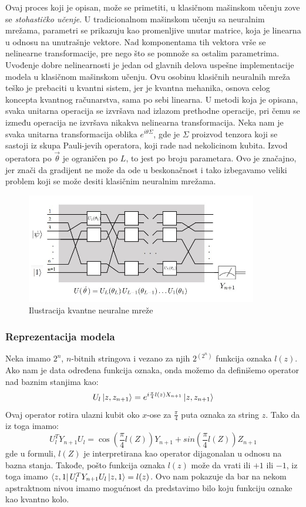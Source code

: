 \documentclass[12pt, letterpaper, oneside]{article}
\begin{document}
Ovaj proces koji je opisan, može se primetiti, u klasičnom mašinskom učenju zove se \textit{stohastičko učenje}.
U tradicionalnom mašinskom učenju sa neuralnim mrežama, parametri se prikazuju kao promenljive unutar matrice, koja je linearna u odnosu na unutrašnje vektore.
Nad komponentama tih vektora vrše se nelinearne transformacije, pre nego što se pomnože sa ostalim parametrima. 
Uvođenje dobre nelinearnosti je jedan od glavnih delova uspešne implementacije modela u klasičnom mašinskom učenju.
Ovu osobinu klasičnih neuralnih mreža teško je prebaciti u kvantni sistem, jer je kvantna mehanika, osnova celog koncepta kvantnog računarstva, sama po sebi linearna.
U metodi koja je opisana, svaka unitarna operacija se izvršava nad izlazom prethodne operacije, pri čemu se između operacija ne izvršava nikakva nelinearna transformacija.
Neka nam je svaka unitarna transformacija oblika $e^{i\theta\Sigma}$, gde je $\Sigma$ proizvod tenzora koji se sastoji iz skupa Pauli-jevih operatora, koji rade nad nekolicinom kubita.
Izvod operatora po $\overrightarrow{\theta}$ je ograničen po $L$, to jest po broju parametara. Ovo je značajno, jer znači da gradijent ne može da ode u beskonačnost i tako izbegavamo 
veliki problem koji se može desiti klasičnim neuralnim mrežama.

\begin{figure}[ht]
    \centering
    \includegraphics[width=0.9\textwidth]{files/QNN.jpg}
    \caption{Ilustracija kvantne neuralne mreže \cite{Classification_wit_QNN}}
\end{figure}

\subsubsection{Reprezentacija modela}
Neka imamo $2^n$, $n$-bitnih stringova i vezano za njih $2^{(2^n)}$ funkcija oznaka $l(z)$.
Ako nam je data određena funkcija oznaka, onda možemo da definišemo operator nad baznim stanjima kao:
\[
    U_l\Ket{z,z_{n+1}} = e^{i\frac{\pi}{4}l(z)X_{n+1}}\Ket{z,z_{n+1}}
\]
Ovaj operator rotira ulazni kubit oko $x$-ose za $\frac{\pi}{4}$ puta oznaka za string $z$.
Tako da iz toga imamo:
\[
    U_l^TY_{n+1}U_l = \cos(\frac{\pi}{4}l(Z))Y_{n+1} + sin(\frac{\pi}{4}l(Z))Z_{n+1}
\]
gde u formuli, $l(Z)$ je interpretirana kao operator dijagonalan u odnosu na bazna stanja.
Takođe, pošto funkcija oznaka $l(z)$ može da vrati ili $+1$ ili $-1$, iz toga imamo $\bra{z,1}U_l^TY_{n+1}U_l\ket{z,1} = l(z)$.
Ovo nam pokazuje da bar na nekom apstraktnom nivou imamo mogućnost da predstavimo bilo koju funkciju oznake kao kvantno kolo.
\end{document}

